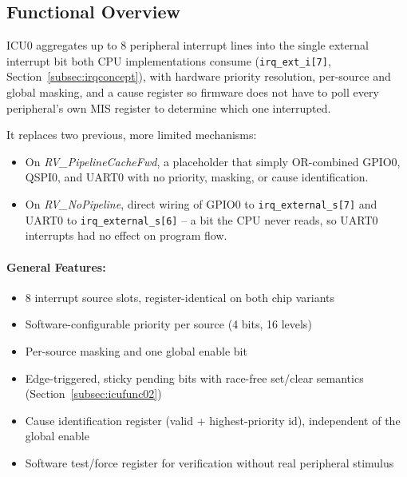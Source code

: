 \subsection{Functional Overview}
\label{subsec:icufunc01}

ICU0 aggregates up to 8 peripheral interrupt lines into the single
external interrupt bit both CPU implementations consume
(\texttt{irq\_ext\_i[7]}, Section~\ref{subsec:irqconcept}), with
hardware priority resolution, per-source and global masking, and a cause
register so firmware does not have to poll every peripheral's own MIS
register to determine which one interrupted.

It replaces two previous, more limited mechanisms:
\begin{itemize}
  \item On \textit{RV\_PipelineCacheFwd}, a placeholder that simply
    OR-combined GPIO0, QSPI0, and UART0 with no priority, masking, or
    cause identification.
  \item On \textit{RV\_NoPipeline}, direct wiring of GPIO0 to
    \texttt{irq\_external\_s[7]} and UART0 to
    \texttt{irq\_external\_s[6]} -- a bit the CPU never reads, so UART0
    interrupts had no effect on program flow.
\end{itemize}

\paragraph{General Features:}
\begin{itemize}
  \item 8 interrupt source slots, register-identical on both chip variants
  \item Software-configurable priority per source (4 bits, 16 levels)
  \item Per-source masking and one global enable bit
  \item Edge-triggered, sticky pending bits with race-free set/clear
    semantics (Section~\ref{subsec:icufunc02})
  \item Cause identification register (valid + highest-priority id),
    independent of the global enable
  \item Software test/force register for verification without real
    peripheral stimulus
\end{itemize}

